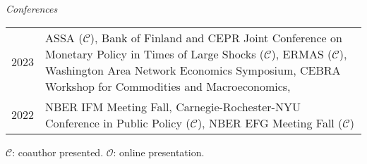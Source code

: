 \documentclass[10pt]{article}
\begin{document}
\noindent \emph{Conferences}\\[0.1in]
\begin{small}
\begin{tabular}{@{}lp{15.5cm}}
2023& ASSA ($\mathcal{C}$), Bank of Finland and CEPR Joint Conference on Monetary Policy in Times of Large Shocks ($\mathcal{C}$), ERMAS ($\mathcal{C}$), Washington Area Network Economics Symposium, CEBRA Workshop for Commodities and Macroeconomics, \\
2022& NBER IFM Meeting Fall, Carnegie-Rochester-NYU Conference in Public Policy ($\mathcal{C}$), NBER EFG Meeting Fall ($\mathcal{C}$)
\end{tabular}
\end{small}

{\footnotesize $\mathcal{C}$: coauthor presented. $\mathcal{O}$: online presentation.}









%
%
%
\end{document}
